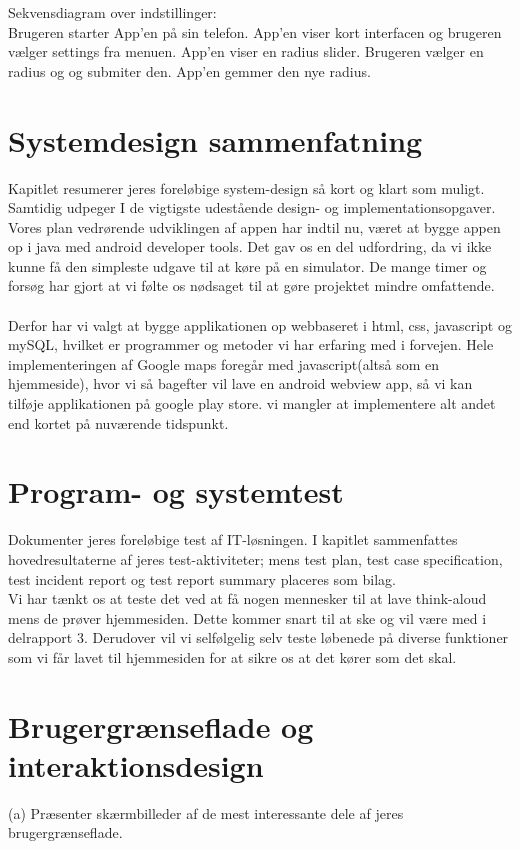 \documentclass[12pt]{article}
\begin{document}
Sekvensdiagram over indstillinger:\\
Brugeren starter App'en på sin telefon. App'en viser kort interfacen og brugeren vælger settings fra menuen.
App'en viser en radius slider. Brugeren vælger en radius og og submiter den. App'en gemmer den nye radius.


\pagebreak

\section{Systemdesign sammenfatning}
Kapitlet resumerer jeres foreløbige system-design så kort og klart som muligt. Samtidig
udpeger I de vigtigste udestående design- og implementationsopgaver.\\

Vores plan vedrørende udviklingen af appen har indtil nu, været at bygge appen op i java med android developer tools. Det gav os en del udfordring, da vi ikke kunne få den simpleste udgave til at køre på en simulator. De mange timer og forsøg har gjort at vi følte os nødsaget til at gøre projektet mindre omfattende. 
\\\\
Derfor har vi valgt at bygge applikationen op webbaseret i html, css, javascript og mySQL, hvilket er programmer og metoder vi har erfaring med i forvejen. 
Hele implementeringen af Google maps foregår med javascript(altså som en hjemmeside), hvor vi så bagefter vil lave en android webview app, så vi kan tilføje applikationen på google play store. vi mangler at implementere alt andet end kortet på nuværende tidspunkt.

\section{Program- og systemtest}
Dokumenter jeres foreløbige test af IT-løsningen. I kapitlet sammenfattes hovedresultaterne af
jeres test-aktiviteter; mens test plan, test case specification, test incident report og test report
summary placeres som bilag.\\
Vi har tænkt os at teste det ved at få nogen mennesker til at lave think-aloud mens de prøver hjemmesiden. Dette kommer snart til at ske og vil være med i delrapport 3. Derudover vil vi selfølgelig selv teste løbenede på diverse funktioner som vi får lavet til hjemmesiden for at sikre os at det kører som det skal.
\pagebreak
\section{Brugergrænseflade og interaktionsdesign}
(a) Præsenter skærmbilleder af de mest interessante dele af jeres brugergrænseflade.
\end{document}

